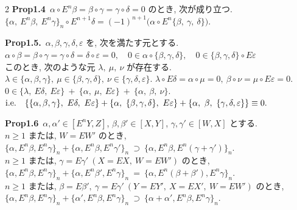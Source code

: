 \documentclass[10pt, leqno]{ltjsarticle}
\newcommand{\Ex}{E}        %
\numberwithin{equation}{section}
\theoremstyle{plain}
\theoremstyle{definition}
\theoremstyle{remark}
\begin{document}
\begin{paracol}{2}
\noindent
\textbf{Prop1.4}\
$\alpha\circ \Ex^n\beta=\beta\circ\gamma=\gamma\circ\delta=0$ のとき, 
次が成り立つ.\\
\(
\{\alpha,\ \Ex^n\beta,\ \Ex^n\gamma\}_n\circ\Ex^{n+1}\delta
=
(-1)^{n+1}\bigl(\alpha\circ \Ex^n\{\beta,\ \gamma,\ \delta\}\bigr).
\)

\noindent
\textbf{Prop1.5.}\
$\alpha,\beta,\gamma,\delta,\varepsilon$ を,
次を満たす元とする. \\
\(
\alpha\circ \beta=\beta\circ\gamma=\gamma\circ\delta=\delta\circ\varepsilon=0,\quad
0\in \alpha\circ\{\beta, \gamma, \delta\},\quad
0\in\{\beta, \gamma, \delta\}\circ\Ex\varepsilon
\)\\
このとき,
次のような元 \(\lambda,\ \mu,\ \nu\) が存在する.\\
\(
\lambda\in\{\alpha,\beta,\gamma\},\
\mu\in\{\beta,\gamma,\delta\},\
\nu\in\{\gamma,\delta,\varepsilon\}.
\)
\(
\lambda\circ \Ex\delta=\alpha\circ \mu=0,\
\beta\circ \nu=\mu\circ \Ex\varepsilon=0.
\)\\
\(
0 \in 
\{\lambda,\ \Ex\delta,\ \Ex\varepsilon\}
\ +\
\{\alpha,\ \mu,\ \Ex\varepsilon\}
\ +\
\{\alpha,\ \beta,\ \nu\}.
\)\\
\(
\textnormal{i.e.}\quad
\{\{\alpha,\beta,\gamma\},\ E\delta,\ E\varepsilon\}
+\{\alpha,\ \{\beta,\gamma,\delta\},\ E\varepsilon\}
+\{\alpha,\ \beta,\ \{\gamma,\delta,\varepsilon\}\}
\equiv0 .
\)

\noindent
\textbf{Prop1.6}\
$\alpha,\alpha'\in[\Ex^n Y, Z]$, $\beta,\beta'\in[X, Y]$, 
$\gamma,\gamma'\in[W, X]$ とする. \\
$n\ge 1$ または, $W=\Ex W'$ のとき,\\
\(
\{\alpha,\Ex^n\beta,\Ex^n\gamma\}_n
+
\{\alpha,\Ex^n\beta,\Ex^n\gamma'\}_n
\ \supset\
\{\alpha,\Ex^n\beta,\Ex^n(\gamma+\gamma')\}_n.
\)\\
$n\ge 1$ または, $\gamma=\Ex\gamma' \ (X=\Ex X,\ W=\Ex W')$ のとき,\\
\(
\{\alpha,\Ex^n\beta,\Ex^n\gamma\}_n
+
\{\alpha,\Ex^n\beta',\Ex^n\gamma\}_n
\ =\
\{\alpha,\Ex^n(\beta+\beta'),\Ex^n\gamma\}_n.
\)\\
$n\ge 1$ または,
$\beta=\Ex\beta',\ \gamma=\Ex\gamma' \ (Y=\Ex Y',\ X=\Ex X',\ W=\Ex W')$ のとき,\\
\(
\{\alpha,\Ex^n\beta,\Ex^n\gamma\}_n
+
\{\alpha',\Ex^n\beta,\Ex^n\gamma\}_n
\ \supset\
\{\alpha+\alpha',\Ex^n\beta,\Ex^n\gamma\}_n.
\)


\end{paracol}
\end{document}
